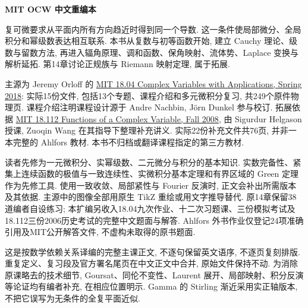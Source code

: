 \frontmatter
\begin{center}
{\color{structurecolor}\bfseries\fontsize{18}{25}\selectfont\BookTitle\par}
{\bfseries MIT OCW 中文重编本\par}
\BookAuthor\par
\BookDate\par
\end{center}
\originalpreface
复可微要求从平面内所有方向趋近时得到同一个导数. 这一条件使局部微分、全局积分和幂级数表达相互联系. 本书从复数与初等函数开始, 建立 Cauchy 理论、级数与留数方法, 再进入辐角原理、调和函数、保角映射、流体势、Laplace 变换与解析延拓. 第14章讨论正规族与 Riemann 映射定理, 属于拓展.

主源为 Jeremy Orloff 的 \href{https://ocw.mit.edu/courses/18-04-complex-variables-with-applications-spring-2018/pages/lecture-notes/}{MIT 18.04 Complex Variables with Applications, Spring 2018}: 实际15份文件, 包括13个专题、课程介绍和多元微积分复习, 共249个原件物理页. 课程介绍注明课程设计源于 Andre Nachbin, Jörn Dunkel 参与校订. 拓展依据 \href{https://ocw.mit.edu/courses/18-112-functions-of-a-complex-variable-fall-2008/pages/lecture-notes/}{MIT 18.112 Functions of a Complex Variable, Fall 2008}, 由 Sigurdur Helgason 授课, Zuoqin Wang 在其指导下整理补充讲义. 实际22份补充文件共76页, 并非一本完整的 Ahlfors 教材. 本书不归档或翻译课程指定的第三方教材.

读者先修为一元微积分、实幂级数、二元微分与积分的基本知识. 实数完备性、紧集上连续函数的极值与一致连续性、实微积分基本定理和有界区域的 Green 定理作为先修工具. 使用一致收敛、局部紧性与 Fourier 反演时, 正文会补出所需版本及其依据. 主源中的图像全部用原生 TikZ 重绘或用文字推导替代. 原14章保留38道编者自设练习; 本扩编另收入18.04九次作业、十二次习题课、三份模拟考试及18.112三份2006历史考试的完整中文题面与解答. Ahlfors 外书作业仅登记24项准确引用及MIT公开解答文件, 不虚构未取得的原书题面.

这是按数学依赖关系译编的完整主课正文, 不逐句保留英文语序, 不逐页复刻排版. 重复定义、复习段及官方署名尾页在中文正文中合并, 原始文件保持不动. 为消除原课略去的技术细节, Goursat、同伦不变性、Laurent 展开、局部映射、积分反演等论证均有编者补充, 在相应位置明示. Gamma 的 Stirling 渐近采用实正轴版本, 不把它误写为无条件的全复平面近似.

